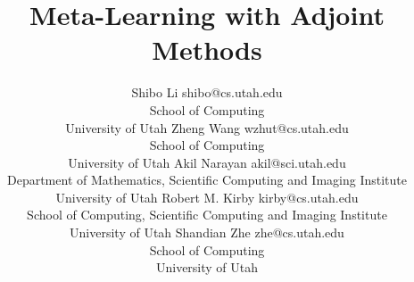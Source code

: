 \documentclass[twoside,11pt]{article}
\begin{document}
\title{Meta-Learning with Adjoint Methods}

\author{\name Shibo Li \email shibo@cs.utah.edu \\
       \addr School of Computing\\
       University of Utah
       \AND
       \name Zheng Wang \email wzhut@cs.utah.edu\\
       \addr School of Computing\\
       University of Utah
       \AND
       \name Akil Narayan \email akil@sci.utah.edu\\
       \addr Department of Mathematics, Scientific Computing and Imaging Institute\\
       University of Utah
       \AND
       \name Robert M. Kirby \email kirby@cs.utah.edu \\
       \addr School of Computing, Scientific Computing and Imaging Institute\\
       University of Utah
       \AND
       \name Shandian Zhe \email zhe@cs.utah.edu \\
       \addr School of Computing\\
       University of Utah }



\maketitle











\newpage

% 


\end{document}
